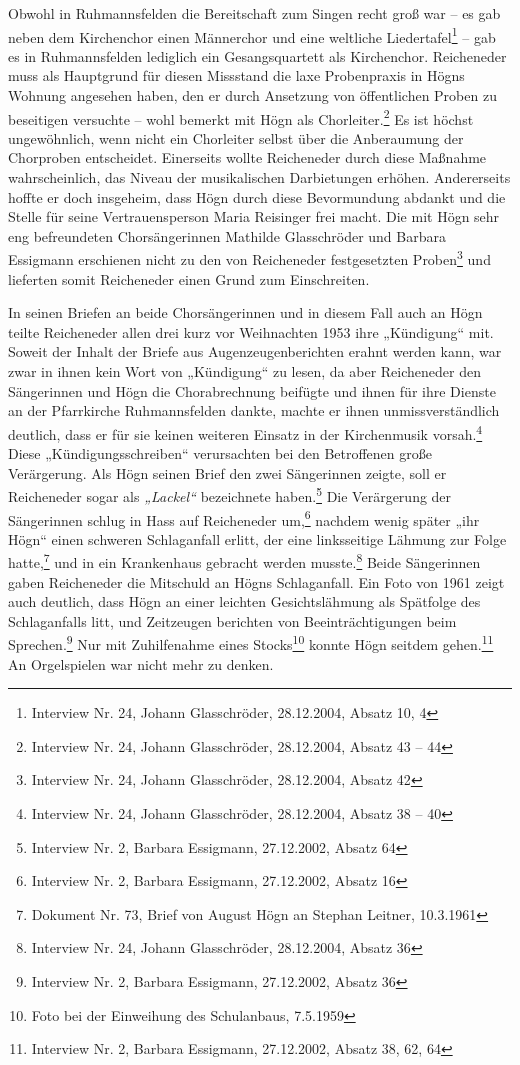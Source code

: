 \documentclass[a4paper]{article}
\newcommand\textstyleZitate[1]{\textit{#1}}
\begin{document}
Obwohl in Ruhmannsfelden die Bereitschaft zum Singen recht groß war – es
gab neben dem Kirchenchor einen Männerchor und eine weltliche
Liedertafel\footnote{ Interview Nr. 24, Johann Glasschröder,
28.12.2004, Absatz 10, 4 } – gab es in Ruhmannsfelden lediglich ein
Gesangsquartett als Kirchenchor. Reicheneder muss als Hauptgrund für
diesen Missstand die laxe Probenpraxis in Högns Wohnung angesehen
haben, den er durch Ansetzung von öffentlichen Proben zu beseitigen
versuchte – wohl bemerkt mit Högn als Chorleiter.\footnote{ Interview
Nr. 24, Johann Glasschröder, 28.12.2004, Absatz 43 – 44} Es ist höchst
ungewöhnlich, wenn nicht ein Chorleiter selbst über die Anberaumung der
Chorproben entscheidet. Einerseits wollte Reicheneder durch diese
Maßnahme wahrscheinlich, das Niveau der musikalischen Darbietungen
erhöhen. Andererseits hoffte er doch insgeheim, dass Högn durch diese
Bevormundung abdankt und die Stelle für seine Vertrauensperson Maria
Reisinger frei macht. Die mit Högn sehr eng befreundeten
Chorsängerinnen Mathilde Glasschröder und Barbara Essigmann erschienen
nicht zu den von Reicheneder festgesetzten Proben\footnote{ Interview
Nr. 24, Johann Glasschröder, 28.12.2004, Absatz 42} und lieferten somit
Reicheneder einen Grund zum Einschreiten. 

In seinen Briefen an beide Chorsängerinnen und in diesem Fall auch an
Högn teilte Reicheneder allen drei kurz vor Weihnachten 1953 ihre
„Kündigung“ mit. Soweit der Inhalt der Briefe aus Augenzeugenberichten
erahnt werden kann, war zwar in ihnen kein Wort von „Kündigung“ zu
lesen, da aber Reicheneder den Sängerinnen und Högn die Chorabrechnung
beifügte und ihnen für ihre Dienste an der Pfarrkirche Ruhmannsfelden
dankte, machte er ihnen unmissverständlich deutlich, dass er für sie
keinen weiteren Einsatz in der Kirchenmusik vorsah.\footnote{ Interview
Nr. 24, Johann Glasschröder, 28.12.2004, Absatz 38 – 40} Diese
„Kündigungsschreiben“ verursachten bei den Betroffenen große
Verärgerung. Als Högn seinen Brief den zwei Sängerinnen zeigte, soll er
Reicheneder sogar als \textstyleZitate{„Lackel“} bezeichnete
haben.\footnote{ Interview Nr. 2, Barbara Essigmann, 27.12.2002, Absatz
64} Die Verärgerung der Sängerinnen schlug in Hass auf Reicheneder
um,\footnote{ Interview Nr. 2, Barbara Essigmann, 27.12.2002, Absatz
16} nachdem wenig später „ihr Högn“ einen schweren Schlaganfall erlitt,
der eine linksseitige Lähmung zur Folge hatte,\footnote{ Dokument Nr.
73, Brief von August Högn an Stephan Leitner, 10.3.1961} und in ein
Krankenhaus gebracht werden musste.\footnote{ Interview Nr. 24, Johann
Glasschröder, 28.12.2004, Absatz 36} Beide Sängerinnen gaben
Reicheneder die Mitschuld an Högns Schlaganfall. Ein Foto von 1961
zeigt auch deutlich, dass Högn an einer leichten Gesichtslähmung als
Spätfolge des Schlaganfalls litt, und Zeitzeugen berichten von
Beeinträchtigungen beim Sprechen.\footnote{ Interview Nr. 2, Barbara
Essigmann, 27.12.2002, Absatz 36} Nur mit Zuhilfenahme eines
Stocks\footnote{ Foto bei der Einweihung des Schulanbaus, 7.5.1959}
konnte Högn seitdem gehen.\footnote{ Interview Nr. 2, Barbara
Essigmann, 27.12.2002, Absatz 38, 62, 64} An Orgelspielen war nicht
mehr zu denken.
\end{document}
